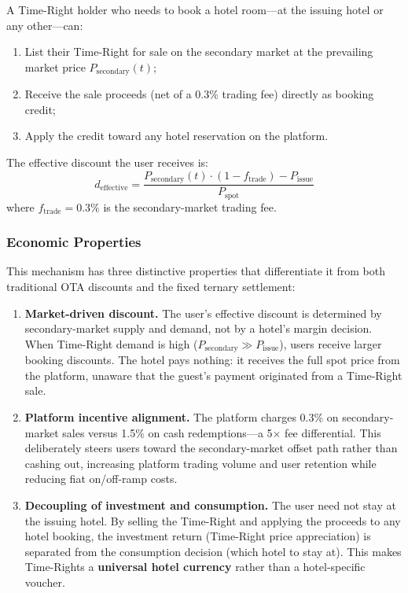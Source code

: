 \documentclass[12pt,a4paper]{article}
\begin{document}
A Time-Right holder who needs to book a hotel room---at the issuing hotel or any other---can:
\begin{enumerate}[nosep]
    \item List their Time-Right for sale on the secondary market at the prevailing market price $P_{\text{secondary}}(t)$;
    \item Receive the sale proceeds (net of a 0.3\% trading fee) directly as booking credit;
    \item Apply the credit toward any hotel reservation on the platform.
\end{enumerate}

The effective discount the user receives is:
\begin{equation}
    d_{\text{effective}} = \frac{P_{\text{secondary}}(t) \cdot (1 - f_{\text{trade}}) - P_{\text{issue}}}{P_{\text{spot}}}
\end{equation}
where $f_{\text{trade}} = 0.3\%$ is the secondary-market trading fee.

\subsubsection{Economic Properties}

This mechanism has three distinctive properties that differentiate it from both traditional OTA discounts and the fixed ternary settlement:

\begin{enumerate}[nosep]
    \item \textbf{Market-driven discount.} The user's effective discount is determined by secondary-market supply and demand, not by a hotel's margin decision.
    When Time-Right demand is high ($P_{\text{secondary}} \gg P_{\text{issue}}$), users receive larger booking discounts.
    The hotel pays nothing: it receives the full spot price from the platform, unaware that the guest's payment originated from a Time-Right sale.

    \item \textbf{Platform incentive alignment.} The platform charges 0.3\% on secondary-market sales versus 1.5\% on cash redemptions---a 5$\times$ fee differential.
    This deliberately steers users toward the secondary-market offset path rather than cashing out, increasing platform trading volume and user retention while reducing fiat on/off-ramp costs.

    \item \textbf{Decoupling of investment and consumption.} The user need not stay at the issuing hotel.
    By selling the Time-Right and applying the proceeds to any hotel booking, the investment return (Time-Right price appreciation) is separated from the consumption decision (which hotel to stay at).
    This makes Time-Rights a \textbf{universal hotel currency} rather than a hotel-specific voucher.
\end{enumerate}
\end{document}

